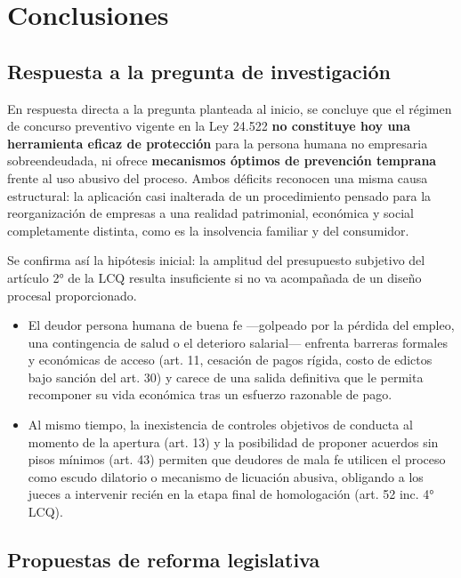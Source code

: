 \documentclass[12pt,oneside]{book}
\begin{document}
\chapter[Conclusiones]{Conclusiones}

\section{Respuesta a la pregunta de investigación}

En respuesta directa a la pregunta planteada al inicio, se concluye que el régimen de concurso preventivo vigente en la Ley 24.522 \textbf{no constituye hoy una herramienta eficaz de protección} para la persona humana no empresaria sobreendeudada, ni ofrece \textbf{mecanismos óptimos de prevención temprana} frente al uso abusivo del proceso. Ambos déficits reconocen una misma causa estructural: la aplicación casi inalterada de un procedimiento pensado para la reorganización de empresas a una realidad patrimonial, económica y social completamente distinta, como es la insolvencia familiar y del consumidor.

Se confirma así la hipótesis inicial: la amplitud del presupuesto subjetivo del artículo 2° de la LCQ resulta insuficiente si no va acompañada de un diseño procesal proporcionado.

\begin{itemize}
    \item El deudor persona humana de buena fe ---golpeado por la pérdida del empleo, una contingencia de salud o el deterioro salarial--- enfrenta barreras formales y económicas de acceso (art. 11, cesación de pagos rígida, costo de edictos bajo sanción del art. 30) y carece de una salida definitiva que le permita recomponer su vida económica tras un esfuerzo razonable de pago.
    \item Al mismo tiempo, la inexistencia de controles objetivos de conducta al momento de la apertura (art. 13) y la posibilidad de proponer acuerdos sin pisos mínimos (art. 43) permiten que deudores de mala fe utilicen el proceso como escudo dilatorio o mecanismo de licuación abusiva, obligando a los jueces a intervenir recién en la etapa final de homologación (art. 52 inc. 4° LCQ).
\end{itemize}

\section{Propuestas de reforma legislativa}
\end{document}
